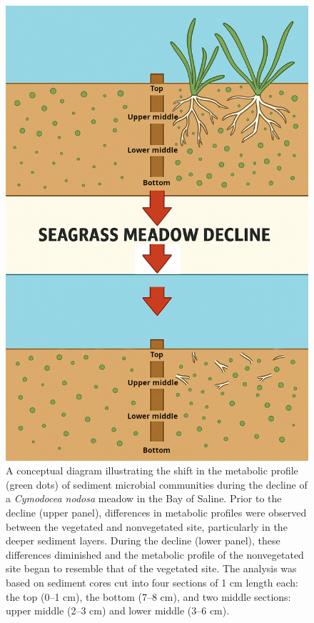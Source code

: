 \documentclass[
  12 pt,
]{book}
\begin{document}
\begin{figure}[ht!]

{\centering \includegraphics[width=0.65\linewidth]{figures/influence-seagrass-decline} 

}

\caption{A conceptual diagram illustrating the shift in the metabolic profile (green dots) of sediment microbial communities during the decline of a \emph{Cymodocea nodosa} meadow in the Bay of Saline. Prior to the decline (upper panel), differences in metabolic profiles were observed between the vegetated and nonvegetated site, particularly in the deeper sediment layers. During the decline (lower panel), these differences diminished and the metabolic profile of the nonvegetated site began to resemble that of the vegetated site. The analysis was based on sediment cores cut into four sections of 1 \si{\cm} length each: the top (0--1 \si{\cm}), the bottom (7--8 \si{\cm}), and two middle sections: upper middle (2--3 \si{\cm}) and lower middle (3--6 \si{\cm}).}\label{fig:influence-seagrass-decline}
\end{figure}
\end{document}
